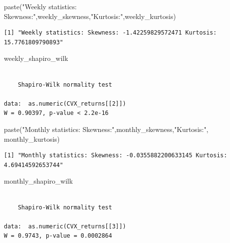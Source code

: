 \documentclass[
  letterpaper,
  DIV=11,
  numbers=noendperiod]{scrartcl}
\newenvironment{Shaded}{\begin{snugshade}}{\end{snugshade}}
\newcommand{\FunctionTok}[1]{\textcolor[rgb]{0.28,0.35,0.67}{#1}}
\newcommand{\NormalTok}[1]{\textcolor[rgb]{0.00,0.23,0.31}{#1}}
\newcommand{\StringTok}[1]{\textcolor[rgb]{0.13,0.47,0.30}{#1}}
\begin{document}
\begin{Shaded}
\begin{Highlighting}[]
\FunctionTok{paste}\NormalTok{(}\StringTok{"Weekly statistics: Skewness:"}\NormalTok{,weekly\_skewness,}\StringTok{"Kurtosis:"}\NormalTok{,weekly\_kurtosis)}
\end{Highlighting}
\end{Shaded}

\begin{verbatim}
[1] "Weekly statistics: Skewness: -1.42259829572471 Kurtosis: 15.7761809790893"
\end{verbatim}

\begin{Shaded}
\begin{Highlighting}[]
\NormalTok{weekly\_shapiro\_wilk}
\end{Highlighting}
\end{Shaded}

\begin{verbatim}

    Shapiro-Wilk normality test

data:  as.numeric(CVX_returns[[2]])
W = 0.90397, p-value < 2.2e-16
\end{verbatim}

\begin{Shaded}
\begin{Highlighting}[]
\FunctionTok{paste}\NormalTok{(}\StringTok{"Monthly statistics: Skewness:"}\NormalTok{,monthly\_skewness,}\StringTok{"Kurtosis:"}\NormalTok{,}
\NormalTok{      monthly\_kurtosis)}
\end{Highlighting}
\end{Shaded}

\begin{verbatim}
[1] "Monthly statistics: Skewness: -0.0355882200633145 Kurtosis: 4.69414592653744"
\end{verbatim}

\begin{Shaded}
\begin{Highlighting}[]
\NormalTok{monthly\_shapiro\_wilk}
\end{Highlighting}
\end{Shaded}

\begin{verbatim}

    Shapiro-Wilk normality test

data:  as.numeric(CVX_returns[[3]])
W = 0.9743, p-value = 0.0002864
\end{verbatim}
\end{document}
